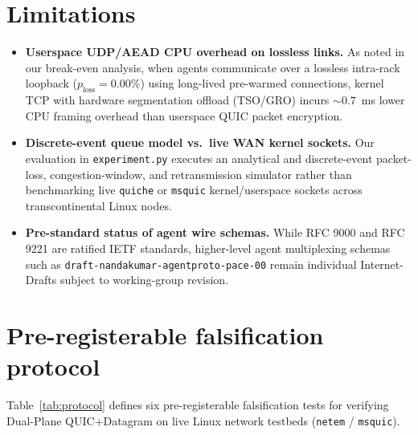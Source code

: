 \documentclass[11pt]{article}
\begin{document}
\section{Limitations}\label{sec:limits}

\begin{itemize}
  \item \textbf{Userspace UDP/AEAD CPU overhead on lossless links.} As noted in our break-even analysis, when agents communicate over a lossless intra-rack loopback ($p_{\mathrm{loss}} = 0.00\%$) using long-lived pre-warmed connections, kernel TCP with hardware segmentation offload (TSO/GRO) incurs $\sim 0.7$~ms lower CPU framing overhead than userspace QUIC packet encryption.
  \item \textbf{Discrete-event queue model vs.\ live WAN kernel sockets.} Our evaluation in \texttt{experiment.\linebreak[0]py} executes an analytical and discrete-event packet-loss, congestion-window, and retransmission simulator rather than benchmarking live \texttt{quiche} or \texttt{msquic} kernel/userspace sockets across transcontinental Linux nodes.
  \item \textbf{Pre-standard status of agent wire schemas.} While RFC 9000 and RFC 9221 are ratified IETF standards, higher-level agent multiplexing schemas such as \texttt{draft-nandakumar-agentproto-pace-00} \citep{nandakumar2026pace} remain individual Internet-Drafts subject to working-group revision.
\end{itemize}

\section{Pre-registerable falsification protocol}\label{sec:protocol}

Table~\ref{tab:protocol} defines six pre-registerable falsification tests for verifying Dual-Plane QUIC+Datagram on live Linux network testbeds (\texttt{netem} / \texttt{msquic}).
\end{document}
